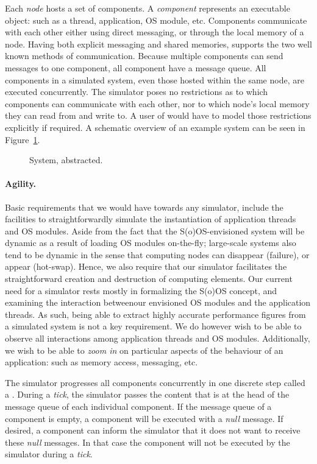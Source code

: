 Each \emph{node} hosts a set of components.
A \emph{component} represents an executable object: such as a thread, application, OS module, etc.
Components communicate with each other either using direct messaging, or through the local memory of a node.
Having both explicit messaging and shared memories, \soosim supports the two well known methods of communication.
Because multiple components can send messages to one component, all component have a message queue.
All components in a simulated system, even those hosted within the same node, are executed concurrently.
The simulator poses no restrictions as to which components can communicate with each other, nor to which node's local memory they can read from and write to.
A user of \soosim would have to model those restrictions explicitly if required.
A schematic overview of an example system can be seen in Figure~\ref{fig:system}.

\def\svgwidth{\columnwidth}
\begin{figure}
%
\caption{System, abstracted.}
\label{fig:system}
\end{figure}

\paragraph{Agility.}
Basic requirements that we would have towards any simulator, include the facilities to straightforwardly simulate the instantiation of application threads and OS modules.
Aside from the fact that the S(o)OS-envisioned system will be dynamic as a result of loading OS modules on-the-fly; large-scale systems also tend to be dynamic in the sense that computing nodes can disappear (failure), or
appear (hot-swap).
Hence, we also require that our simulator facilitates the straightforward creation and destruction of computing elements.
Our current need for a simulator rests mostly in formalizing the S(o)OS concept, and examining the interaction betweenour envisioned OS modules and the application threads.
As such, being able to extract highly accurate performance figures from a simulated system is not a key requirement.
We do however wish to be able to observe all interactions among application threads and OS modules.
Additionally, we wish to be able to \emph{zoom in} on particular aspects of the behaviour of an application: such as memory access, messaging, etc.

The simulator progresses all components concurrently in one discrete step called a .
During a \emph{tick}, the simulator passes the content that is at the head of the message queue of each individual component.
If the message queue of a component is empty, a component will be executed with a \emph{null} message.
If desired, a component can inform the simulator that it does not want to receive these \emph{null} messages.
In that case the component will not be executed by the simulator during a \emph{tick}.


